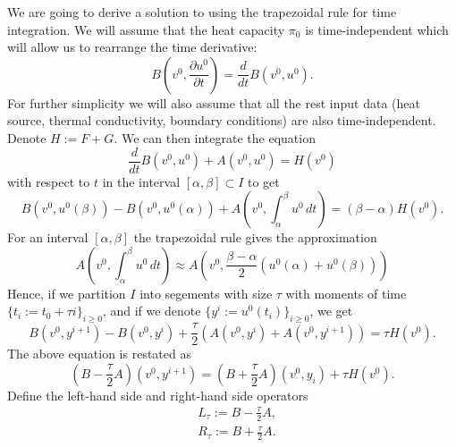 \begin{discussion}
  \label{idec/heat_transport/discrete/primal_weak_transient_solve_trapezoidal-discussion}
  We are going to derive a solution to
  using the trapezoidal rule for time integration.
  We will assume that the heat capacity $\pi_0$ is time-independent which will
  allow us to rearrange the time derivative:
  \begin{equation}
    B(v^0, \frac{\partial u^0} {\partial t}) = \frac{d}{d t} B(v^0, u^0). 
  \end{equation}
  For further simplicity we will also assume that all the rest input data (heat
  source, thermal conductivity, boundary conditions) are also time-independent.
  Denote $H := F + G$. We can then integrate the equation
  \begin{equation}
    \frac{d}{d t} B(v^0, u^0) + A(v^0, u^0) = H(v^0)
  \end{equation}
  with respect to $t$ in the interval $[\alpha, \beta] \subset I$ to get
  \begin{equation}
    B(v^0, u^0(\beta)) - B(v^0, u^0(\alpha))
    + A(v^0, \int_\alpha^\beta u^0\, d t)
    = (\beta - \alpha) H(v^0).
  \end{equation}
  For an interval $[\alpha, \beta]$ the trapezoidal rule gives the approximation
  \begin{equation}
    A(v^0, \int_\alpha^\beta u^0\, d t)
    \approx A(v^0, \frac{\beta - \alpha}{2} (u^0(\alpha) + u^0(\beta)))
  \end{equation}
  Hence, if we partition $I$ into segements with size $\tau$ with moments of
  time $\{t_i := t_0 + \tau i\}_{i \geq 0}$, and if we denote
  $\{y^i := u^0(t_i)\}_{i \geq 0}$, we get
  \begin{equation}
    B(v^0, y^{i + 1}) - B(v^0, y^i)
    + \frac{\tau}{2} (A(v^0, y^i) + A(v^0, y^{i + 1}))
    = \tau H(v^0).
  \end{equation}
  The above equation is restated as
  \begin{equation}
    (B - \frac{\tau}{2} A)(v^0, y^{i + 1})
    = (B + \frac{\tau}{2} A)(v^0, y_i) + \tau H(v^0).
  \end{equation}
  Define the left-hand side and right-hand side operators
  \begin{subequations}
    \begin{alignat}{1}
      & L_\tau := B - \frac{\tau}{2} A, \\
      & R_\tau := B + \frac{\tau}{2} A.
    \end{alignat}

\end{subequations}
\end{discussion}
